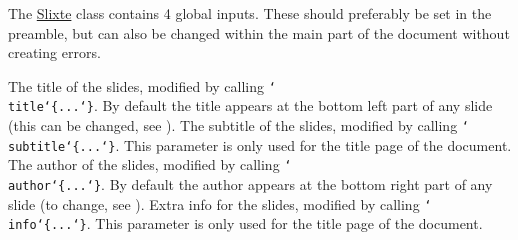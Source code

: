 \documentclass{slixte}
\def\clsurl{https://ctan.org/pkg/slixte}
\newcommand{\codetext}[1]{\texttt{\color{second}#1}}
\newcommand{\cmdt}[1]{\char`\\#1}
\newcommand{\cbrl}{\char`\{}
\newcommand{\cbrr}{\char`\}}
\newcommand{\cbrt}[1]{\cbrl#1\cbrr}
\newcommand{\cben}{Beno\cbrt{\char`\\\char`^i}t}
\newcommand{\codeline}[2][0]{\spacing[0.1]\hspace{-1.2cm}\codetext{\foreach\i in {0,...,#1}{~~~~}#2}\par}
\newcommand{\slixte}{\href{\clsurl}{\color{first}Slixte}}
\begin{document}
\hypertarget{basic:global}{}
\begin{slide}
    The \slixte{} class contains 4 global inputs.
    These should preferably be set in the preamble, but can also be changed within the main part of the document without creating errors.
    \begin{itemize}
        \fillitem The title of the slides, modified by calling \codetext{\cmdt{title}\cbrt{...}}. By default the title appears at the bottom left part of any slide (this can be changed, see ).
        \fillitem The subtitle of the slides, modified by calling \codetext{\cmdt{subtitle}\cbrt{...}}. This parameter is only used for the title page of the document.
        \fillitem The author of the slides, modified by calling \codetext{\cmdt{author}\cbrt{...}}. By default the author appears at the bottom right part of any slide (to change, see ).
        \fillitem Extra info for the slides, modified by calling \codetext{\cmdt{info}\cbrt{...}}. This parameter is only used for the title page of the document.
    \end{itemize}
\end{slide}

\iftoggle{examples}{
\begin{slide}[Global inputs (example)]
    To re-create the title page of this document, include the following in the preamble.

    \spacing

    \codeline{\cmdt{title}\cbrt{Using the Slixte class}}
    \codeline{\cmdt{subtitle}\cbrt{a step-by-step guide}}
    \codeline{\cmdt{author}\cbrt{\cben{} Corsini}}
    \codeline{\cmdt{info}\cbrt{\cmdt{url}\cbrt{https://ctan.org/pkg/slixte}}}

    \spacing[1]

    You can also check that this can be changed dynamically within the document.

    \spacing

    \codeline{\cmdt{titleslide}}
    \codeline{\cmdt{author}\cbrt{Someone Else}}
    \codeline{\cmdt{titleslide}}
\end{slide}
}{}
\end{document}
